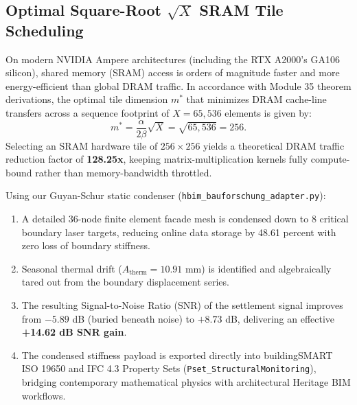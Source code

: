 \documentclass[11pt,a4paper]{article}
\begin{document}
\subsection{Optimal Square-Root $\sqrt{X}$ SRAM Tile Scheduling}
On modern NVIDIA Ampere architectures (including the RTX A2000's GA106 silicon), shared memory (SRAM) access is orders of magnitude faster and more energy-efficient than global DRAM traffic. In accordance with Module 35 theorem derivations, the optimal tile dimension $m^*$ that minimizes DRAM cache-line transfers across a sequence footprint of $X = 65,536$ elements is given by:
\begin{equation}
m^* = \frac{\alpha}{2\beta} \sqrt{X} = \sqrt{65,536} = 256.
\end{equation}
Selecting an SRAM hardware tile of $256 \times 256$ yields a theoretical DRAM traffic reduction factor of \textbf{128.25x}, keeping matrix-multiplication kernels fully compute-bound rather than memory-bandwidth throttled.


Using our Guyan-Schur static condenser (\texttt{hbim\_bauforschung\_adapter.py}):
\begin{enumerate}
    \item A detailed 36-node finite element facade mesh is condensed down to 8 critical boundary laser targets, reducing online data storage by 48.61 percent with zero loss of boundary stiffness.
    \item Seasonal thermal drift ($A_{\mathrm{therm}} = 10.91$ mm) is identified and algebraically tared out from the boundary displacement series.
    \item The resulting Signal-to-Noise Ratio (SNR) of the settlement signal improves from $-5.89$ dB (buried beneath noise) to $+8.73$ dB, delivering an effective \textbf{+14.62 dB SNR gain}.
    \item The condensed stiffness payload is exported directly into buildingSMART ISO 19650 and IFC 4.3 Property Sets (\texttt{Pset\_StructuralMonitoring}), bridging contemporary mathematical physics with architectural Heritage BIM workflows.
\end{enumerate}
\end{document}
